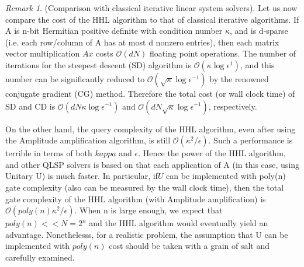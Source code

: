 \documentclass[12pt, oneside]{book}
\theoremstyle{definition}
\theoremstyle{definition}
\theoremstyle{remark}
\newtheorem*{remark}{Remark}
\begin{document}
\begin{remark}
    (Comparison with classical iterative linear system solvers). Let us now compare the cost of the HHL algorithm to that of classical iterative algorithms. If A is n-bit Hermitian positive definite with condition number $\kappa$, and is d-sparse (i.e. each row/column of A has at most d nonzero entries), then each matrix vector multiplication $Ax$ costs $\mathcal{O}(dN)$ floating point operations. The number of iterations for the steepest descent (SD) algorithm is $\mathcal{O}(\kappa\log \epsilon^{1})$, and this number can be significantly reduced to $\mathcal{O}(\sqrt{\kappa}\log \epsilon^{-1})$ by the renowned conjugate gradient (CG) method. Therefore the total cost (or wall clock time) of SD and CD is $\mathcal{O}(dN\kappa \log \epsilon^{-1})$ and $\mathcal{O}(dN\sqrt{\kappa}\log \epsilon^{-1})$, respectively.
\end{remark}
On the other hand, the query complexity of the HHL algorithm, even after using the Amplitude amplification algorithm, is still $\mathcal{O}(\kappa^2/\epsilon)$. Such a performance is terrible in terms of both $kappa$ and $\epsilon$. Hence the power of the HHL algorithm, and other QLSP solvers is based on that each application of A (in this case, using Unitary U) is much faster. In particular, if$U$ can be implemented with poly(n) gate complexity (also can be measured by the wall clock time), then the total gate complexity of the HHL algorithm (with Amplitude amplification) is $\mathcal{O}(poly(n)\kappa^2/\epsilon)$. When n is large enough, we expect that $poly(n)<<N=2^n$ and the HHL algorithm would eventually yield an advantage. Nonethelesss, for a realistic problem, the assumption that U can be implemented with $poly(n)$ cost should be taken with a grain of salt and carefully examined.
\end{document}
